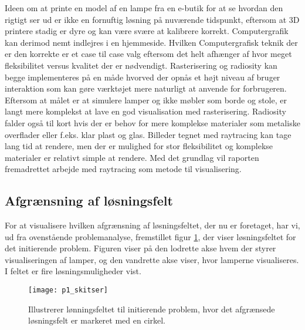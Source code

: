 Ideen om at printe en model af en lampe fra en e-butik for at se hvordan den rigtigt ser ud er ikke en fornuftig løsning på nuværende tidspunkt, eftersom at 3D printere stadig er dyre og kan være svære at kalibrere korrekt. Computergrafik kan derimod nemt indlejres i en hjemmeside. Hvilken Computergrafisk teknik der er den korrekte er et case til case valg eftersom det helt afhænger af hvor meget fleksibilitet versus kvalitet der er nødvendigt. Rasterisering og radiosity kan begge implementeres på en måde hvorved der opnås et højt niveau af bruger interaktion som kan gøre værktøjet mere naturligt at anvende for forbrugeren. Eftersom at målet er at simulere lamper og ikke møbler som borde og stole, er langt mere komplekst at lave en god visualisation med rasterisering. Radiosity falder også til kort hvis der er behov for mere komplekse materialer som metaliske overflader eller f.eks. klar plast og glas. Billeder tegnet med raytracing kan tage lang tid at rendere, men der er mulighed for stor fleksibilitet og komplekse materialer er relativt simple at rendere. Med det grundlag vil raporten fremadrettet arbejde med raytracing som metode til visualisering.

\subsection{Afgrænsning af løsningsfelt}
For at visualisere hvilken afgrænsning af løsningsfeltet, der nu er foretaget, har vi, ud fra ovenstående problemanalyse, fremstillet figur \ref{fig:p1_skitser}, der viser løsningsfeltet for det initierende problem. Figuren viser på den lodrette akse hvem der styrer visualiseringen af lamper, og den vandrette akse viser, hvor lamperne visualiseres. I feltet er fire løsningsmuligheder vist.

\begin{figure}[H]
  
  \centering
  \texttt{[image: p1\_skitser]}
  \caption{Illustrerer lønningsfeltet til initierende problem, hvor det afgrænsede løsningsfelt er markeret med en cirkel.}
  \label{fig:p1_skitser}
\end{figure}

